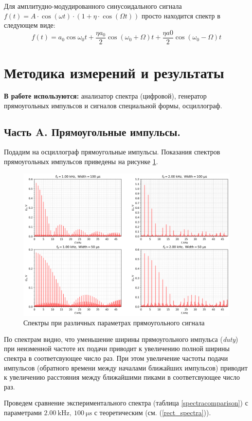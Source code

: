 \documentclass[12pt, a4paper]{article}
\begin{document}
Для амплитудно-модудированного синусоидального сигнала $f(t) = A\cdot \cos (\omega t) \cdot (1+\eta\cdot \cos(\Omega t))$ просто находится спектр в следующем виде:
\begin{equation}
  f(t) = a_0 \cos \omega_0 t + \frac{\eta a_0}{2} \cos{(\omega_0 + \Omega)t} + \frac{\eta a0}{2} \cos{(\omega_0 - \Omega)t}
\end{equation}
\section{Методика измерений и результаты}
\textbf{В работе используются:} анализатор спектра (цифро­вой), генератор прямоугольных импульсов и сигналов специальной формы, осциллограф.

\subsection{Часть A. Прямоугольные импульсы.}
Подадим на осциллограф прямоугольные импульсы. Показания спектров прямоугольных импульсов приведены на рисунке \ref{a4spectra}.

\begin{figure}[H]
  \centering
  \includegraphics[width = 0.8\linewidth]{pics/A_4spectra}
  \caption{Спектры при различных параметрах прямоугольного сигнала}
  \label{a4spectra}
\end{figure}
По спектрам видно, что уменьшение ширины прямоугольного импульса (\textit{duty}) при неизменной частоте их подачи приводит к увеличению полной ширины спектра в соответсвующее число раз. При этом увеличение частоты подачи импульсов (обратного времени между началами ближайших импульсов) приводит к увеличению расстояния между ближайшими пиками в соответсвующее число раз.

Проведем сравнение экспериментального спектра (таблица \ref{spectracomparison}) с параметрами $2.00~\mathrm{kHz},~100~\mathrm{\mu s}$ с теоретическим (см. (\ref{rect_spectra})).
\end{document}

